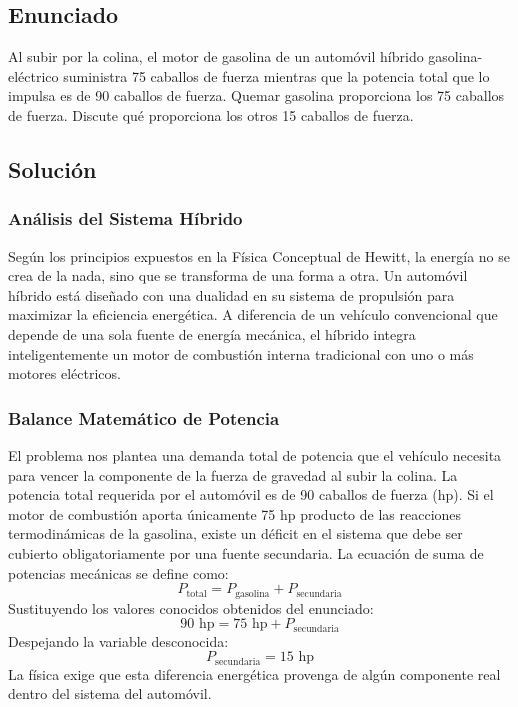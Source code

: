 \documentclass[a4paper,12pt]{article}
\begin{document}
\newpage

\subsection*{Enunciado}
Al subir por la colina, el motor de gasolina de un automóvil híbrido gasolina-eléctrico suministra 75 caballos de fuerza mientras que la potencia total que lo impulsa es de 90 caballos de fuerza. Quemar gasolina proporciona los 75 caballos de fuerza. Discute qué proporciona los otros 15 caballos de fuerza.

\subsection*{Solución}

\subsubsection*{Análisis del Sistema Híbrido}
Según los principios expuestos en la Física Conceptual de Hewitt, la energía no se crea de la nada, sino que se transforma de una forma a otra. Un automóvil híbrido está diseñado con una dualidad en su sistema de propulsión para maximizar la eficiencia energética. A diferencia de un vehículo convencional que depende de una sola fuente de energía mecánica, el híbrido integra inteligentemente un motor de combustión interna tradicional con uno o más motores eléctricos.

\subsubsection*{Balance Matemático de Potencia}
El problema nos plantea una demanda total de potencia que el vehículo necesita para vencer la componente de la fuerza de gravedad al subir la colina. La potencia total requerida por el automóvil es de 90 caballos de fuerza (hp). Si el motor de combustión aporta únicamente 75 hp producto de las reacciones termodinámicas de la gasolina, existe un déficit en el sistema que debe ser cubierto obligatoriamente por una fuente secundaria.
La ecuación de suma de potencias mecánicas se define como:
$$P_{\text{total}} = P_{\text{gasolina}} + P_{\text{secundaria}}$$
Sustituyendo los valores conocidos obtenidos del enunciado:
$$90 \text{ hp} = 75 \text{ hp} + P_{\text{secundaria}}$$
Despejando la variable desconocida:
$$P_{\text{secundaria}} = 15 \text{ hp}$$
La física exige que esta diferencia energética provenga de algún componente real dentro del sistema del automóvil.
\end{document}
